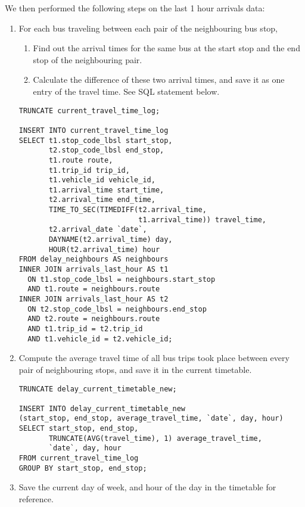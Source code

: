 \par We then performed the following steps on the last 1 hour arrivals data:

\begin{enumerate}
  \item For each bus traveling between each pair of the neighbouring bus stop,
  \begin{enumerate}
    \item Find out the arrival times for the same bus at the start stop and the end stop of the neighbouring pair.
    \item Calculate the difference of these two arrival times, and save it as one entry of the travel time. See SQL statement below.
  \end{enumerate}
\begin{verbatim}
TRUNCATE current_travel_time_log;

INSERT INTO current_travel_time_log
SELECT t1.stop_code_lbsl start_stop,
       t2.stop_code_lbsl end_stop,
       t1.route route,
       t1.trip_id trip_id,
       t1.vehicle_id vehicle_id,
       t1.arrival_time start_time,
       t2.arrival_time end_time,
       TIME_TO_SEC(TIMEDIFF(t2.arrival_time,
                            t1.arrival_time)) travel_time,
       t2.arrival_date `date`,
       DAYNAME(t2.arrival_time) day,
       HOUR(t2.arrival_time) hour
FROM delay_neighbours AS neighbours
INNER JOIN arrivals_last_hour AS t1
  ON t1.stop_code_lbsl = neighbours.start_stop
  AND t1.route = neighbours.route
INNER JOIN arrivals_last_hour AS t2
  ON t2.stop_code_lbsl = neighbours.end_stop
  AND t2.route = neighbours.route
  AND t1.trip_id = t2.trip_id
  AND t1.vehicle_id = t2.vehicle_id;
\end{verbatim}
  \item Compute the average travel time of all bus trips took place between every pair of neighbouring stops, and save it in the current timetable.

\begin{verbatim}
TRUNCATE delay_current_timetable_new;

INSERT INTO delay_current_timetable_new
(start_stop, end_stop, average_travel_time, `date`, day, hour)
SELECT start_stop, end_stop,
       TRUNCATE(AVG(travel_time), 1) average_travel_time,
       `date`, day, hour
FROM current_travel_time_log
GROUP BY start_stop, end_stop;
\end{verbatim}

  \item Save the current day of week, and hour of the day in the timetable for reference.
\end {enumerate}

